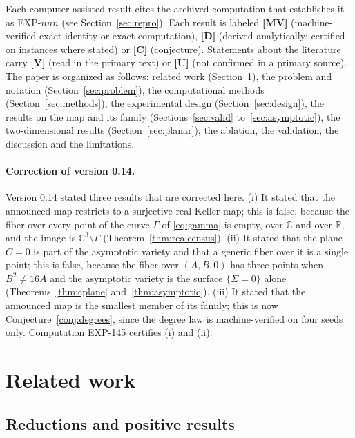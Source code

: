 \documentclass[11pt]{article}
\theoremstyle{definition}
\theoremstyle{remark}
\newcommand{\C}{\mathbb{C}}
\newcommand{\R}{\mathbb{R}}
\newcommand{\MV}{\textbf{[MV]}}
\newcommand{\DD}{\textbf{[D]}}
\newcommand{\CC}{\textbf{[C]}}
\newcommand{\VV}{\textbf{[V]}}
\newcommand{\UU}{\textbf{[U]}}
\begin{document}
Each computer-assisted result cites the archived computation that establishes it as EXP-$nnn$ (see
Section~\ref{sec:repro}). Each result is labeled \MV{} (machine-verified exact identity or exact
computation), \DD{} (derived analytically; certified on instances where stated) or \CC{} (conjecture).
Statements about the literature carry \VV{} (read in the primary text) or \UU{} (not confirmed in a
primary source). The paper is organized as follows: related work (Section~\ref{sec:related}), the problem
and notation (Section~\ref{sec:problem}), the computational methods (Section~\ref{sec:methods}), the
experimental design (Section~\ref{sec:design}), the results on the map and its family
(Sections~\ref{sec:valid} to~\ref{sec:asymptotic}), the two-dimensional results (Section~\ref{sec:planar}), the ablation, the validation, the
discussion and the limitations.

\paragraph{Correction of version 0.14.}%
Version 0.14 stated three results that are corrected here. (i) It stated that the announced map restricts to a surjective real Keller map; this is false, because the fiber over every point of the curve $\Gamma$ of \eqref{eq:gamma} is empty, over $\C$ and over $\R$, and the image is $\C^3 \setminus \Gamma$ (Theorem~\ref{thm:realcensus}). (ii) It stated that the plane $C = 0$ is part of the asymptotic variety and that a generic fiber over it is a single point; this is false, because the fiber over $(A,B,0)$ has three points when $B^2 \neq 16A$ and the asymptotic variety is the surface $\{\Sigma = 0\}$ alone (Theorems~\ref{thm:cplane} and~\ref{thm:asymptotic}). (iii) It stated that the announced map is the smallest member of its family; this is now Conjecture~\ref{conj:degrees}, since the degree law is machine-verified on four seeds only. Computation EXP-145 certifies (i) and (ii). %

\section{Related work}\label{sec:related}

\subsection{Reductions and positive results}
\end{document}
